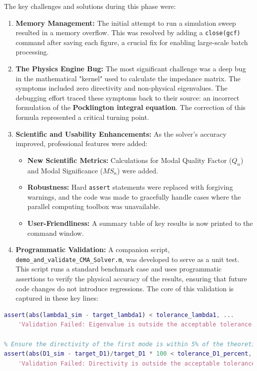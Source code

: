 \documentclass[11pt, a4paper]{article}
\begin{document}
The key challenges and solutions during this phase were:
\begin{enumerate}
    \item \textbf{Memory Management:} The initial attempt to run a simulation sweep resulted in a memory overflow. This was resolved by adding a \texttt{close(gcf)} command after saving each figure, a crucial fix for enabling large-scale batch processing.
    \item \textbf{The Physics Engine Bug:} The most significant challenge was a deep bug in the mathematical "kernel" used to calculate the impedance matrix. The symptoms included zero directivity and non-physical eigenvalues. The debugging effort traced these symptoms back to their source: an incorrect formulation of the \textbf{Pocklington integral equation}. The correction of this formula represented a critical turning point.
    \item \textbf{Scientific and Usability Enhancements:} As the solver's accuracy improved, professional features were added:
    \begin{itemize}
        \item \textbf{New Scientific Metrics:} Calculations for Modal Quality Factor ($Q_n$) and Modal Significance ($MS_n$) were added.
        \item \textbf{Robustness:} Hard \texttt{assert} statements were replaced with forgiving warnings, and the code was made to gracefully handle cases where the parallel computing toolbox was unavailable.
        \item \textbf{User-Friendliness:} A summary table of key results is now printed to the command window.
    \end{itemize}
    \item \textbf{Programmatic Validation:} A companion script, \texttt{demo\_and\_validate\_CMA\_Solver.m}, was developed to serve as a unit test. This script runs a standard benchmark case and uses programmatic assertions to verify the physical accuracy of the results, ensuring that future code changes do not introduce regressions. The core of this validation is captured in these key lines:
\end{enumerate}

\begin{lstlisting}[language=Matlab, caption={Key assertion statements in the validation script, with explanatory comments.}, label={lst:assert}]
% Ensure the first eigenvalue is near zero, as expected for a resonant dipole.
assert(abs(lambda1_sim - target_lambda1) < tolerance_lambda1, ...
    'Validation Failed: Eigenvalue is outside the acceptable tolerance.');
   
% Ensure the directivity of the first mode is within 5% of the theoretical value.
assert(abs(D1_sim - target_D1)/target_D1 * 100 < tolerance_D1_percent, ...
    'Validation Failed: Directivity is outside the acceptable tolerance.');
\end{lstlisting}
\end{document}
